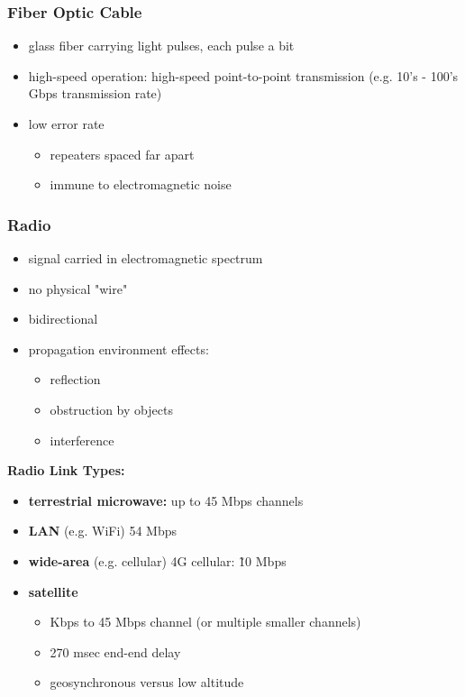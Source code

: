 \subsubsection{Fiber Optic Cable}
\begin{itemize}
	\item glass fiber carrying light pulses, each pulse a bit
	\item high-speed operation: high-speed point-to-point transmission (e.g. 10's - 100's Gbps transmission rate)
	\item low error rate
	\begin{itemize}
		\item repeaters spaced far apart
		\item immune to electromagnetic noise
	\end{itemize}
\end{itemize}
\subsubsection{Radio}
\begin{itemize}
	\item signal carried in electromagnetic spectrum
	\item no physical "wire"
	\item bidirectional
	\item propagation environment effects:
	\begin{itemize}
		\item reflection
		\item obstruction by objects
		\item interference
	\end{itemize}
\end{itemize}
\textbf{Radio Link Types:}
\begin{itemize}
	\item \textbf{terrestrial microwave:} up to 45 Mbps channels
	\item \textbf{LAN} (e.g. WiFi) 54 Mbps
	\item \textbf{wide-area} (e.g. cellular) 4G cellular: \~ 10 Mbps
	\item \textbf{satellite}
	\begin{itemize}
		\item Kbps to 45 Mbps channel (or multiple smaller channels)
		\item 270 msec end-end delay
		\item geosynchronous versus low altitude
	\end{itemize}
\end{itemize}

